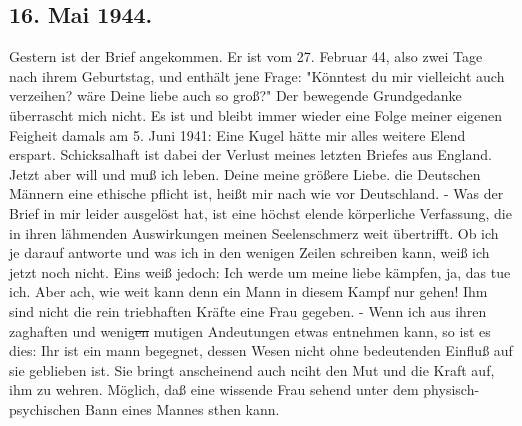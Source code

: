 \subsection{16. Mai 1944.}

Gestern ist der Brief angekommen.
Er ist vom 27. Februar 44, also zwei Tage nach ihrem Geburtstag, und enth\"{a}lt jene Frage: "K\"{o}nntest du mir vielleicht auch verzeihen? w\"{a}re Deine liebe auch so gro{\ss}?"
Der bewegende Grundgedanke \"{u}berrascht mich nicht.
Es ist und bleibt immer wieder eine Folge meiner eigenen Feigheit damals am 5. Juni 1941: Eine Kugel h\"{a}tte mir alles weitere Elend erspart.
Schicksalhaft ist dabei der Verlust meines letzten Briefes aus England.
Jetzt aber will und mu{\ss} ich leben.
Deine meine gr\"{o}{\ss}ere Liebe. die Deutschen M\"{a}nnern eine ethische pflicht ist, hei{\ss}t mir nach wie vor Deutschland.
- Was der Brief in mir leider ausgel\"{o}st hat, ist eine h\"{o}chst elende k\"{o}rperliche Verfassung, die in ihren l\"{a}hmenden Auswirkungen meinen Seelenschmerz weit \"{u}bertrifft.
Ob ich je darauf antworte und was ich in den wenigen Zeilen schreiben kann, wei{\ss} ich jetzt noch nicht.
Eins wei{\ss} jedoch: Ich werde um meine liebe k\"{a}mpfen, ja, das tue ich.
Aber ach, wie weit kann denn ein Mann in diesem Kampf nur gehen!
Ihm sind nicht die rein triebhaften Kr\"{a}fte eine Frau gegeben.
- Wenn ich aus ihren zaghaften und wenig\st{en}
mutigen Andeutungen etwas entnehmen kann, so ist es dies: Ihr ist ein mann begegnet, dessen Wesen nicht ohne bedeutenden Einflu{\ss} auf sie geblieben ist.
Sie bringt anscheinend auch nciht den Mut und die Kraft auf, ihm zu wehren.
M\"{o}glich, da{\ss} eine wissende Frau sehend unter dem physisch-psychischen Bann eines Mannes sthen kann.

\clearpage

